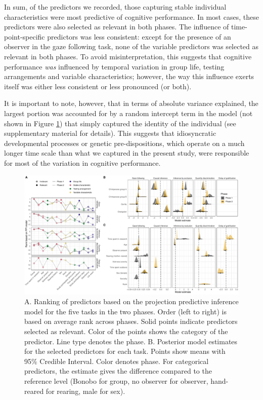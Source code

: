 \documentclass[
  man,floatsintext]{apa6}
\begin{document}
In sum, of the predictors we recorded, those capturing stable individual characteristics were most predictive of cognitive performance. In most cases, these predictors were also selected as relevant in both phases. The influence of time-point-specific predictors was less consistent: except for the presence of an observer in the gaze following task, none of the variable predictors was selected as relevant in both phases. To avoid misinterpretation, this suggests that cognitive performance \emph{was} influenced by temporal variation in group life, testing arrangements and variable characteristics; however, the way this influence exerts itself was either less consistent or less pronounced (or both).

It is important to note, however, that in terms of absolute variance explained, the largest portion was accounted for by a random intercept term in the model (not shown in Figure \ref{fig:ppiplot}) that simply captured the identity of the individual (see supplementary material for details). This suggests that idiosyncratic developmental processes or genetic pre-dispositions, which operate on a much longer time scale than what we captured in the present study, were responsible for most of the variation in cognitive performance.

\begin{figure}

{\centering \includegraphics[width=1\linewidth]{./figures/ppi3_i7} 

}

\caption{A. Ranking of predictors based on the projection predictive inference model for the five tasks in the two phases. Order (left to right) is based on average rank across phases. Solid points indicate predictors selected as relevant. Color of the points shows the category of the predictor. Line type denotes the phase. B. Posterior model estimates for the selected predictors for each task. Points show means with 95\% Credible Interval. Color denotes phase. For categorical predictors, the estimate gives the difference compared to the reference level (Bonobo for group, no observer for observer, hand-reared for rearing, male for sex).}\label{fig:ppiplot}
\end{figure}
\end{document}
